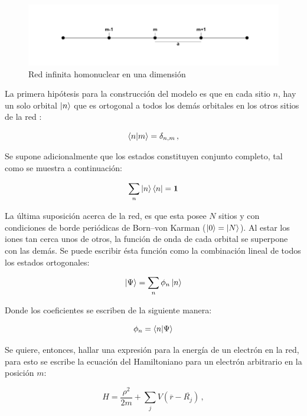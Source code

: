 \begin{figure}[H]
    \centering
    \includegraphics[scale=0.6]{imagenes/red.png}
    \caption{Red infinita homonuclear en una dimensión}
    \label{fig:5.1}
\end{figure}

La primera hipótesis para la construcción del modelo es que en cada sitio $n$, hay un solo orbital $\ket{n}$ que es ortogonal a todos los demás orbitales en los otros sitios de la red \cite{oxford}:

\begin{equation}\label{eq:5.1}
    \braket{n}{m}=\delta_{n,m}\,,
\end{equation}

Se supone adicionalmente que los estados constituyen conjunto completo, tal como se muestra a continuación:

\begin{equation}\label{eq:5.2}
    \sum_n \ket{n}\bra{n}=\mathbf{1}
\end{equation}

La última suposición acerca de la red, es que esta posee $N$ sitios y con condiciones de borde periódicas de Born–von Karman ($\ket{0}=\ket{N}$). Al estar los iones tan cerca unos de otros, la función de onda de cada orbital se superpone con las demás. Se puede escribir ésta función como la combinación lineal de todos los estados ortogonales\cite{oxford}:

\begin{equation}\label{eq:5.3}
    \ket{\Psi}=\sum_n \phi_n\ket{n}
\end{equation}

Donde los coeficientes se escriben de la siguiente manera:

\begin{equation}\label{eq:5.4}
    \phi_n=\braket{n}{\Psi}
\end{equation}

Se quiere, entonces, hallar una expresión para la energía de un electrón en la red, para esto se escribe la ecuación del Hamiltoniano para un electrón arbitrario en la posición $m$:

\begin{equation}\label{eq:5.5}
    H=\frac{\rho^2}{2m}+\sum_j V(\overline{r}-\overline{R_j})\,,
\end{equation}

